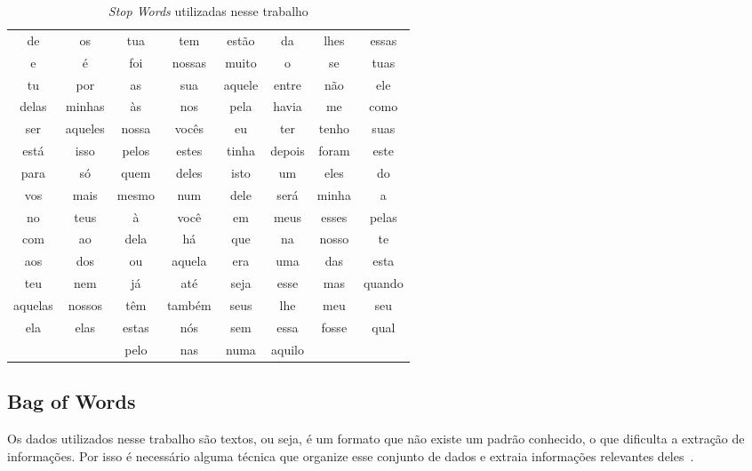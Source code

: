           \begin{table}[h]\label{tb:stopwords}
            \centering
            \begin{tabular}{cccccccc}
            \cline{1-8}
            de & os & tua & tem & estão & da & lhes & essas \\
            e & é & foi & nossas & muito & o & se & tuas \\
            tu & por & as & sua & aquele & entre & não & ele \\
            delas & minhas & às & nos & pela & havia & me & como \\
            ser & aqueles & nossa & vocês & eu & ter & tenho & suas \\
            está & isso & pelos & estes & tinha & depois & foram & este \\
            para & só & quem & deles & isto & um & eles & do \\
            vos & mais & mesmo & num & dele & será & minha & a \\
            no & teus & à & você & em & meus & esses & pelas \\
            com & ao & dela & há & que & na & nosso & te \\
            aos & dos & ou & aquela & era & uma & das & esta \\
            teu & nem & já & até & seja & esse & mas & quando \\
            aquelas & nossos & têm & também & seus & lhe & meu & seu \\
            ela & elas & estas & nós & sem & essa & fosse & qual \\
            & & pelo & nas & numa & aquilo & & \\
            \cline{1-8}
            \end{tabular}
            \caption{\textit{Stop Words} utilizadas nesse trabalho}
            \label{exemplos-stop-words}
            \end{table}
            
  

  \subsection{Bag of Words}

            Os dados utilizados nesse trabalho são textos, ou seja, é um formato que não existe um padrão conhecido, o que dificulta
            a extração de informações. Por isso é necessário alguma técnica que organize esse conjunto de dados e extraia informações
            relevantes deles~\cite{wallach2006topic}.


